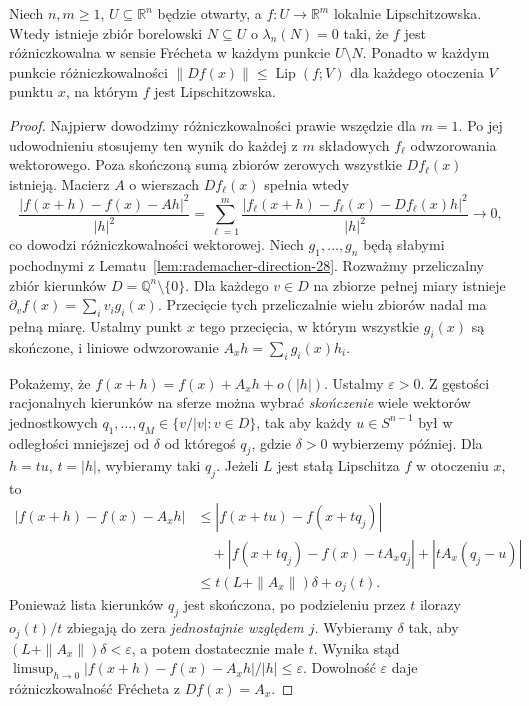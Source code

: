 \begin{twierdzenie}[Rademacher]
\label{thm:rademacher-28}
Niech $n,m\ge1$, $U\subseteq\mathbb R^n$ będzie
otwarty, a $f:U\to\mathbb R^m$ lokalnie Lipschitzowska.
Wtedy istnieje zbiór borelowski $N\subseteq U$ o
$\lambda_n(N)=0$ taki, że $f$ jest różniczkowalna
w sensie Frécheta w każdym punkcie $U\setminus N$.
Ponadto w każdym punkcie różniczkowalności
$\|Df(x)\|\le\operatorname{Lip}(f;V)$ dla
każdego otoczenia $V$ punktu $x$, na którym $f$
jest Lipschitzowska.
\end{twierdzenie}
\begin{proof}
Najpierw dowodzimy różniczkowalności prawie wszędzie
dla $m=1$. Po jej udowodnieniu stosujemy ten wynik
do każdej z $m$ składowych $f_\ell$ odwzorowania
wektorowego. Poza skończoną sumą zbiorów zerowych
wszystkie $Df_\ell(x)$ istnieją. Macierz $A$ o wierszach
$Df_\ell(x)$ spełnia wtedy
\[
 \frac{|f(x+h)-f(x)-Ah|^2}{|h|^2}
 =\sum_{\ell=1}^m
 \frac{|f_\ell(x+h)-f_\ell(x)-Df_\ell(x)h|^2}{|h|^2}
 \longrightarrow0,
\]
co dowodzi różniczkowalności wektorowej.
Niech $g_1,\ldots,g_n$ będą słabymi pochodnymi z
Lematu~\ref{lem:rademacher-direction-28}. Rozważmy
przeliczalny zbiór kierunków $D=\mathbb Q^n\setminus\{0\}$.
Dla każdego $v\in D$ na zbiorze pełnej miary
istnieje $\partial_v f(x)=\sum_i v_i g_i(x)$.
Przecięcie tych przeliczalnie wielu zbiorów nadal
ma pełną miarę. Ustalmy punkt $x$ tego przecięcia,
w którym wszystkie $g_i(x)$ są skończone, i liniowe
odwzorowanie $A_xh=\sum_i g_i(x)h_i$.

Pokażemy, że $f(x+h)=f(x)+A_xh+o(|h|)$.
Ustalmy $\varepsilon>0$. Z gęstości racjonalnych
kierunków na sferze można wybrać \emph{skończenie}
wiele wektorów jednostkowych
$q_1,\ldots,q_M\in\{v/|v|:v\in D\}$, tak aby
każdy $u\in S^{n-1}$ był w odległości mniejszej
od $\delta$ od któregoś $q_j$, gdzie
$\delta>0$ wybierzemy później. Dla $h=tu$, $t=|h|$,
wybieramy taki $q_j$. Jeżeli $L$ jest stałą
Lipschitza $f$ w otoczeniu $x$, to
\begin{align*}
 |f(x+h)-f(x)-A_xh|
 &\le |f(x+tu)-f(x+tq_j)|\\
 &\quad+|f(x+tq_j)-f(x)-tA_xq_j|
       +|tA_x(q_j-u)|\\
 &\le t(L+\|A_x\|)\delta+o_j(t).
\end{align*}
Ponieważ lista kierunków $q_j$ jest skończona,
po podzieleniu przez $t$ ilorazy $o_j(t)/t$
zbiegają do zera \emph{jednostajnie względem $j$}.
Wybieramy $\delta$ tak, aby
$(L+\|A_x\|)\delta<\varepsilon$, a potem
dostatecznie małe $t$. Wynika stąd
$\limsup_{h\to0}|f(x+h)-f(x)-A_xh|/|h|\le\varepsilon$.
Dowolność $\varepsilon$ daje różniczkowalność
Frécheta z $Df(x)=A_x$.


\end{proof}
